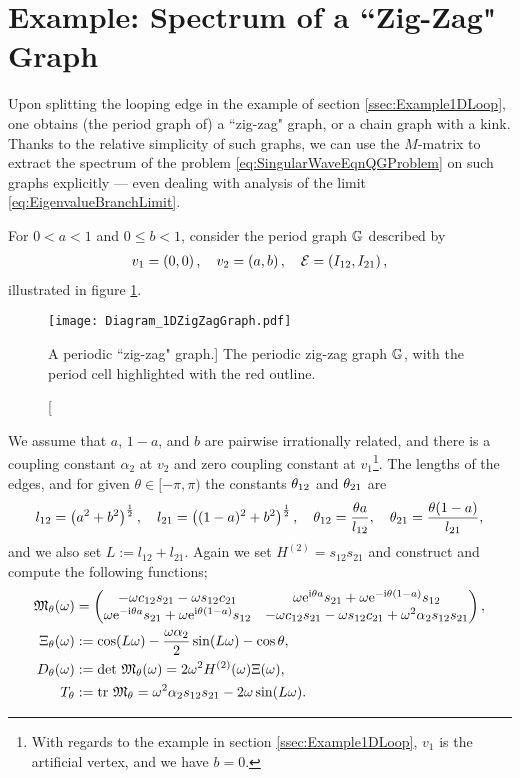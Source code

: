 \section{Example: Spectrum of a ``Zig-Zag" Graph} \label{sec:Scalar-General1DChain}
Upon splitting the looping edge in the example of section \ref{ssec:Example1DLoop}, one obtains (the period graph of) a ``zig-zag" graph, or a chain graph with a kink.
Thanks to the relative simplicity of such graphs, we can use the $M$-matrix to extract the spectrum of the problem \eqref{eq:SingularWaveEqnQGProblem} on such graphs explicitly --- even dealing with analysis of the limit \eqref{eq:EigenvalueBranchLimit}.

For $0<a<1$ and $0\leq b<1$, consider the period graph $\mathbb{G}$ described by
\begin{align*}
	v_1=\left( 0,0 \right), \quad
	v_2=\left( a,b \right), \quad
	\mathcal{E} = \left( I_{12},I_{21} \right),
\end{align*}
illustrated in figure \ref{fig:Diagram_1DZigZagGraph}.
\begin{figure}[b!]
	\centering
	\texttt{[image: Diagram\_1DZigZagGraph.pdf]}
	\caption[A periodic ``zig-zag" graph.]{\label{fig:Diagram_1DZigZagGraph} The periodic zig-zag graph $\mathbb{G}$, with the period cell highlighted with the red outline.}
\end{figure}
We assume that $a$, $1-a$, and $b$ are pairwise irrationally related, and there is a coupling constant $\alpha_2$ at $v_2$ and zero coupling constant at $v_1$\footnote{With regards to the example in section \ref{ssec:Example1DLoop}, $v_1$ is the artificial vertex, and we have $b=0$.}.
The lengths of the edges, and for given $\theta\in[-\pi,\pi)$ the constants $\theta_{12}$ and $\theta_{21}$ are
\begin{align*}
	l_{12} = \left( a^2+b^2 \right)^{\frac{1}{2}}, \quad
	l_{21} = \left( (1-a)^2+b^2 \right)^{\frac{1}{2}}, \quad
	\theta_{12} = \frac{\theta a}{l_{12}}, \quad
	\theta_{21} = \frac{\theta (1-a)}{l_{21}},
\end{align*}
and we also set $L:=l_{12}+l_{21}$.
Again we set $H^{(2)}=s_{12}s_{21}$ and construct and compute the following functions;
\begin{align*}
	\mathfrak{M}_{\theta}(\omega) &=
	\begin{pmatrix}
		-\omega c_{12}s_{21} - \omega s_{12}c_{21} & 
		\omega \mathrm{e}^{\mathrm{i}\theta a}s_{21} + \omega \mathrm{e}^{-\mathrm{i}\theta(1-a)}s_{12} \\
		\omega \mathrm{e}^{-\mathrm{i}\theta a}s_{21} + \omega \mathrm{e}^{\mathrm{i}\theta(1-a)}s_{12} &
		-\omega c_{12}s_{21} - \omega s_{12}c_{21} + \omega^2\alpha_2 s_{12}s_{21}
	\end{pmatrix}, \\
	\Xi_{\theta}(\omega) &:= \cos(L\omega) - \frac{\omega\alpha_2}{2}\sin(L\omega) - \cos\theta, \\
	D_{\theta}(\omega) &:= \mathrm{det} \ \mathfrak{M}_{\theta}(\omega) = 2 \omega^2 H^{(2)}(\omega)\Xi(\omega), \\
	T_{\theta} &:= \mathrm{tr} \ \mathfrak{M}_{\theta} = \omega^2\alpha_2 s_{12}s_{21} - 2\omega\sin(L\omega).
\end{align*}
